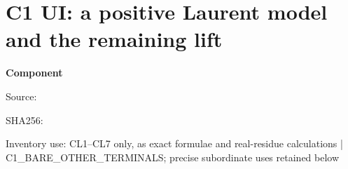 \chapter{C1 UI: a positive Laurent model and the remaining lift}
\label{component:p050c7ae6d9b8}
\noindent\textbf{Component }\par
{\small\noindent Source: \par}
{\small\noindent SHA256: \par}
{\small\noindent Inventory use: CL1--CL7 only, as exact formulae and real-residue calculations | C1\_\allowbreak{}BARE\_\allowbreak{}OTHER\_\allowbreak{}TERMINALS; precise subordinate uses retained below\par}
\medskip
